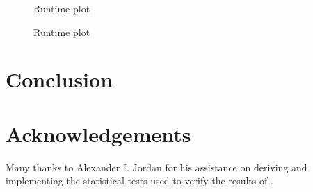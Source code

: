\documentclass{article}
\begin{document}
\begin{figure}
    \centering
    
    \caption{Runtime plot}\label{fig:runtime-taxa}
\end{figure}

\begin{figure}
    \centering
    
    \caption{Runtime plot}\label{fig:runtime-regions}
\end{figure}

\section{Conclusion}

\section{Acknowledgements}

Many thanks to Alexander I. Jordan for his assistance on deriving and
implementing the statistical tests used to verify the results of \bigrig{}.


\end{document}
